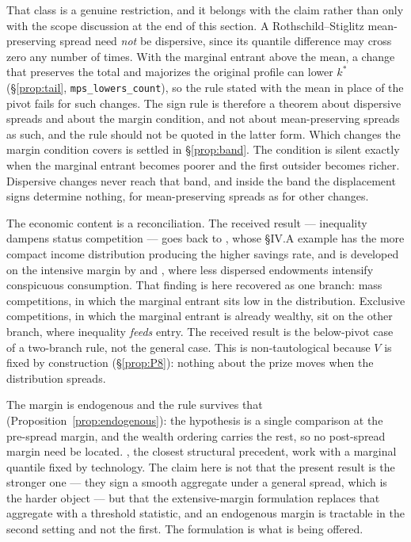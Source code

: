 \documentclass[11pt]{article}
\begin{document}
That class is a genuine restriction, and it belongs with the claim rather than
only with the scope discussion at the end of this section. A
Rothschild--Stiglitz mean-preserving spread need \emph{not} be dispersive, since
its quantile difference may cross zero any number of times. With the marginal
entrant above the mean, a change that preserves the total and majorizes the
original profile can lower $k^*$ (\S\ref{prop:tail}, \texttt{mps\_lowers\_count}),
so the rule stated with the mean in place of the pivot fails for such changes.
The sign rule is therefore a theorem about dispersive spreads and about the
margin condition, and not about mean-preserving spreads as such, and the rule
should not be quoted in the latter form. Which changes the margin condition
covers is settled in \S\ref{prop:band}. The condition is silent exactly when
the marginal entrant becomes poorer and the first outsider becomes richer.
Dispersive changes never reach that band, and inside the band the displacement
signs determine nothing, for mean-preserving spreads as for other changes.

The economic content is a reconciliation. The received result --- inequality
dampens status competition --- goes back to
\citet{ColeMailathPostlewaite1992}, whose \S IV.A example has the more
compact income distribution producing the higher savings rate, and is
developed on the intensive margin by \citet{HopkinsKornienko2004} and
\citet{HopkinsKornienko2010}, where less dispersed endowments intensify
conspicuous consumption. That finding is here recovered as one branch: mass
competitions, in which the marginal entrant sits low in the distribution.
Exclusive competitions, in which the marginal entrant is already wealthy,
sit on the other branch, where inequality \emph{feeds} entry. The received
result is the below-pivot case of a two-branch rule, not the general case.
This is non-tautological because $V$ is fixed by construction
(\S\ref{prop:P8}): nothing about the prize moves when the distribution
spreads.

The margin is endogenous and the rule survives that
(Proposition~\ref{prop:endogenous}): the hypothesis is a single comparison at
the pre-spread margin, and the wealth ordering carries the rest, so no
post-spread margin need be located. \citet{CostrellLoury2004}, the closest
structural precedent, work with a marginal quantile fixed by technology. The
claim here is not that the present result is the stronger one --- they sign a
smooth aggregate under a general spread, which is the harder object --- but
that the extensive-margin formulation replaces that aggregate with a
threshold statistic, and an endogenous margin is tractable in the second
setting and not the first. The formulation is what is being offered.
\end{document}
